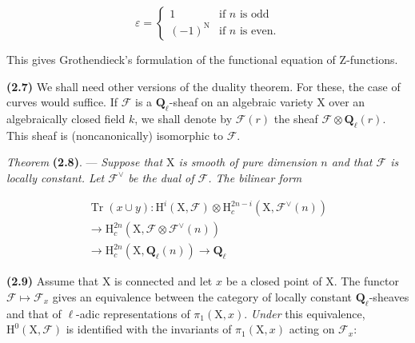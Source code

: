 \documentclass[10pt,leqno]{article}
\begin{document}
\[\varepsilon=\begin{cases}1&\text{if }n\text{ is odd}\\(-1)^{\mathrm N}&\text{if }n\text{ is even}.\end{cases}\]

\noindent This gives Grothendieck’s formulation of the functional equation of \(\mathrm{Z}\)-functions.\par

\noindent \textbf{(2.7)} We shall need other versions of the duality theorem. For these, the case of curves would suffice. If \(\mathcal{F} \) is a \(\mathbf{Q}_{\ell }\)-sheaf on an algebraic variety \(\mathrm{X}\) over an algebraically closed field \(k\), we shall denote by \(\mathcal{F} (r)\) the sheaf \(\mathcal{F} \otimes \mathbf{Q}_{\ell }(r)\). This sheaf is (noncanonically) isomorphic to \(\mathcal{F} \).\par

\noindent \emph{Theorem} \textbf{(2.8)}. — {\itshape Suppose that \(\mathrm{X}\) is smooth of pure dimension \(n\) and that \(\mathcal{F} \) is locally constant. Let \(\mathcal{F} ^{\vee }\) be the dual of \(\mathcal{F} \). The bilinear form}\par

\begin{equation*}\begin{gathered}\operatorname{Tr}(x\cup y) : \mathrm{H}^{i}(\mathrm{X},\mathcal{F} )\otimes \mathrm{H}_{c}^{2n- i}(\mathrm{X},\mathcal{F} ^{\vee }(n)) \\ \longrightarrow  \mathrm{H}_{c}^{2n}(\mathrm{X},\mathcal{F} \otimes \mathcal{F} ^{\vee }(n)) \\ \longrightarrow  \mathrm{H}_{c}^{2n}(\mathrm{X},\mathbf{Q}_{\ell }(n)) \longrightarrow  \mathbf{Q}_{\ell }\end{gathered}\end{equation*}

\par

\noindent \textbf{(2.9)} Assume that \(\mathrm{X}\) is connected and let \(x\) be a closed point of \(\mathrm{X}\). The functor \(\mathcal{F} \longmapsto \mathcal{F} _{x}\) gives an equivalence between the category of locally constant \(\mathbf{Q}_{\ell }\)-sheaves and that of \(\ell \)-adic representations of \(\pi _{1}(\mathrm{X},x)\). \emph{Under} this equivalence, \(\mathrm{H}^{0}(\mathrm{X},\mathcal{F} )\) is identified with the invariants of \(\pi _{1}(\mathrm{X},x)\) acting on \(\mathcal{F} _{x}\):\par
\end{document}
